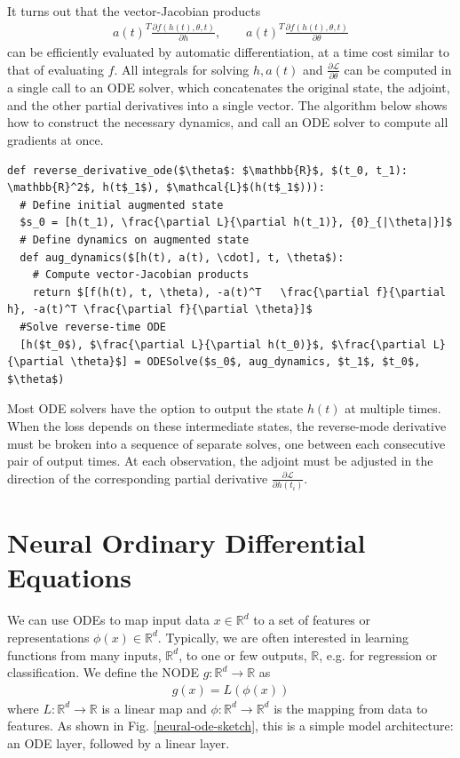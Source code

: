 \documentclass[book.tex]{subfiles}
\begin{document}
It turns out that the vector-Jacobian products 
\begin{align}
a(t)^T \frac{\partial f(h(t),\theta,t)}{\partial h}, \qquad a(t)^T \frac{\partial f(h(t),\theta,t)}{\partial \theta}
\end{align}
can be efficiently evaluated by automatic differentiation, at a time cost similar to that of evaluating $f$.  All integrals for solving $h, a(t)$ and $\frac{\partial \mathcal{L}}{\partial \theta}$ can be computed in a single call to an ODE solver, which concatenates the original state, the adjoint, and the other partial derivatives into a single vector. The algorithm below shows how to construct the necessary dynamics, and call an ODE solver to compute all gradients at once.
\begin{lstlisting}
def reverse_derivative_ode($\theta$: $\mathbb{R}$, $(t_0, t_1): \mathbb{R}^2$, h(t$_1$), $\mathcal{L}$(h(t$_1$))):
  # Define initial augmented state
  $s_0 = [h(t_1), \frac{\partial L}{\partial h(t_1)}, {0}_{|\theta|}]$ 
  # Define dynamics on augmented state
  def aug_dynamics($[h(t), a(t), \cdot], t, \theta$):
    # Compute vector-Jacobian products
    return $[f(h(t), t, \theta), -a(t)^T   \frac{\partial f}{\partial h}, -a(t)^T \frac{\partial f}{\partial \theta}]$ 
  #Solve reverse-time ODE
  [h($t_0$), $\frac{\partial L}{\partial h(t_0)}$, $\frac{\partial L}{\partial \theta}$] = ODESolve($s_0$, aug_dynamics, $t_1$, $t_0$, $\theta$)

\end{lstlisting}

Most ODE solvers have the option to output the state $h(t)$ at multiple times. When the loss depends on these intermediate states, the reverse-mode derivative must be broken into a sequence of separate solves, one between each consecutive pair of output times. %
At each observation, the adjoint must be adjusted in the direction of the corresponding partial derivative $\frac{\partial \mathcal{L}}{\partial h(t_i)}$.


\section{Neural Ordinary Differential Equations} 
We can use ODEs to map input data $x \in \mathbb{R}^d$ to a set of features or representations $\phi(x) \in \mathbb{R}^d$. Typically, we are often interested in learning functions from many inputs, $\mathbb{R}^d$, to one or few outputs, $\mathbb{R}$, e.g. for regression or classification. We define the NODE $g : \mathbb{R}^d \to \mathbb{R}$ as 
\begin{align}
g(x) = L(\phi(x))
\end{align} 
where $L : \mathbb{R}^d \to \mathbb{R}$ is a linear map and $\phi: \mathbb{R}^d \to \mathbb{R}^d$ is the mapping from data to features. As shown in Fig. \ref{neural-ode-sketch}, this is a simple model architecture: an ODE layer, followed by a linear layer.
\end{document}
